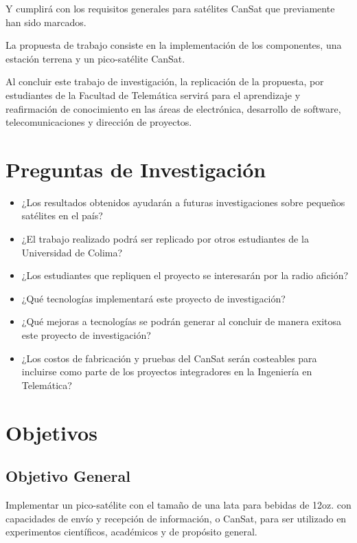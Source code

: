 Y cumplir\'{a} con los requisitos generales para sat\'{e}lites CanSat que previamente han sido marcados.


La propuesta de trabajo consiste en la implementaci\'{o}n de los componentes, una estaci\'{o}n terrena y un pico-sat\'{e}lite CanSat.


Al concluir este trabajo de investigaci\'{o}n, la replicaci\'{o}n de la propuesta, por estudiantes de la Facultad de Telem\'{a}tica servir\'{a} para el aprendizaje y reafirmaci\'{o}n de conocimiento en las \'{a}reas de electr\'{o}nica, desarrollo de software, telecomunicaciones y direcci\'{o}n de proyectos.

\section{Preguntas de Investigaci\'{o}n}
\begin{itemize}
\item ¿Los resultados obtenidos ayudar\'{a}n a futuras investigaciones sobre peque\~{n}os sat\'{e}lites en el pa\'{i}s?
\item ¿El trabajo realizado podr\'{a} ser replicado por otros estudiantes de la Universidad de Colima?
\item ¿Los estudiantes que repliquen el proyecto se interesar\'{a}n por la radio afici\'{o}n?
\item ¿Qu\'{e} tecnolog\'{i}as implementar\'{a} este proyecto de investigaci\'{o}n?
\item ¿Qu\'{e} mejoras a tecnolog\'{i}as se podr\'{a}n generar al concluir de manera exitosa este proyecto de investigaci\'{o}n?
\item ¿Los costos de fabricaci\'{o}n y pruebas del CanSat ser\'{a}n costeables para incluirse como parte de los proyectos integradores en la Ingenier\'{i}a en Telem\'{a}tica?
\end{itemize}

\section{Objetivos}
\subsection{Objetivo General}
Implementar  un pico-sat\'{e}lite con el tama\~{n}o de una lata para bebidas de 12oz. con capacidades de env\'{i}o y recepci\'{o}n de informaci\'{o}n, o CanSat, para ser utilizado en experimentos cient\'{i}ficos, acad\'{e}micos y de prop\'{o}sito general.

